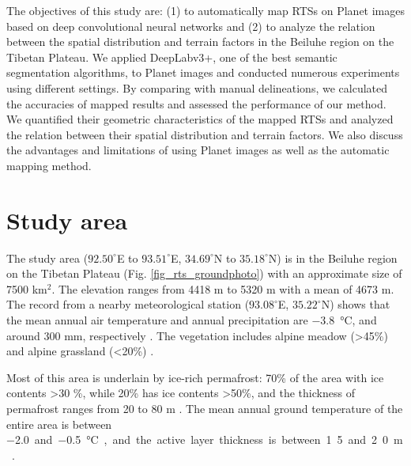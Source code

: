\documentclass[preprint,12pt,authoryear]{elsarticle}
\begin{document}
The objectives of this study are: (1) to automatically map RTSs on Planet images based on deep convolutional neural networks and (2) to analyze the relation between the spatial distribution and terrain factors in the Beiluhe region on the Tibetan Plateau. We applied DeepLabv3+, one of the best semantic segmentation algorithms, to Planet images and conducted numerous experiments using different settings. By comparing with manual delineations, we calculated the accuracies of mapped results and assessed the performance of our method. We quantified their geometric characteristics of the mapped RTSs and analyzed the relation between their spatial distribution and terrain factors. We also discuss the advantages and limitations of using Planet images as well as the automatic mapping method. 


\section{Study area}
\label{sec_studyarea}
The study area ($92.50^\circ$E to $93.51^\circ$E, $34.69^\circ$N to $35.18^\circ$N) is in the Beiluhe region on the Tibetan Plateau (Fig. \ref{fig_rts_groundphoto}) with an approximate size of 7500 km$^2$. The elevation ranges from 4418 m to 5320 m with a mean of 4673 m. The record from a nearby meteorological station ($93.08^\circ$E, $35.22^\circ$N) shows that the mean annual air temperature and annual precipitation are \SI{-3.8}{\celsius}, and around 300 mm, respectively \citep{luo_thermokarst_2015}. The vegetation includes alpine meadow (\textgreater 45\%) and alpine grassland (\textless 20\%) \citep{luo_thermokarst_2015}. 

Most of this area is underlain by ice-rich permafrost: 70\% of the area with ice contents \textgreater 30 \%, while 20\% has ice contents \textgreater 50\%, and the thickness of permafrost ranges from 20 to 80 m \citep{zhou_geocryology_2000, luo_thermokarst_2015}. The mean annual ground temperature of the entire area is between \SI{-2.0} and \SI{-0.5}{\celsius}, and the active layer thickness is between 1.5 and 2.0 m \citep{zhou_geocryology_2000, luo_thermokarst_2015, wu2010changes, wu2015changes}. %
\end{document}
